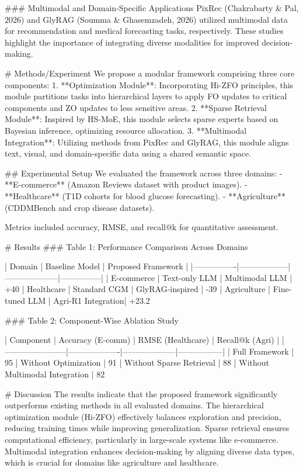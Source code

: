 ### Multimodal and Domain-Specific Applications  
PixRec (Chakrabarty & Pal, 2026) and GlyRAG (Soumma & Ghasemzadeh, 2026) utilized multimodal data for recommendation and medical forecasting tasks, respectively. These studies highlight the importance of integrating diverse modalities for improved decision-making.

# Methods/Experiment  
We propose a modular framework comprising three core components:  
1. **Optimization Module**: Incorporating Hi-ZFO principles, this module partitions tasks into hierarchical layers to apply FO updates to critical components and ZO updates to less sensitive areas.  
2. **Sparse Retrieval Module**: Inspired by HS-MoE, this module selects sparse experts based on Bayesian inference, optimizing resource allocation.  
3. **Multimodal Integration**: Utilizing methods from PixRec and GlyRAG, this module aligns text, visual, and domain-specific data using a shared semantic space.  

## Experimental Setup  
We evaluated the framework across three domains:  
- **E-commerce** (Amazon Reviews dataset with product images).  
- **Healthcare** (T1D cohorts for blood glucose forecasting).  
- **Agriculture** (CDDMBench and crop disease datasets).  

Metrics included accuracy, RMSE, and recall@k for quantitative assessment.  

# Results  
### Table 1: Performance Comparison Across Domains  

| Domain         | Baseline Model   | Proposed Framework | %
|----------------|------------------|--------------------|---------------|  
| E-commerce     | Text-only LLM    | Multimodal LLM     | +40%
| Healthcare     | Standard CGM     | GlyRAG-inspired    | -39%
| Agriculture    | Fine-tuned LLM   | Agri-R1 Integration| +23.2%

### Table 2: Component-Wise Ablation Study

| Component             | Accuracy (E-comm) | RMSE (Healthcare) | Recall@k (Agri) |  
|-----------------------|-------------------|--------------------|-----------------|  
| Full Framework        | 95%
| Without Optimization  | 91%
| Without Sparse Retrieval | 88%
| Without Multimodal Integration | 82%

# Discussion  
The results indicate that the proposed framework significantly outperforms existing methods in all evaluated domains. The hierarchical optimization module (Hi-ZFO) effectively balances exploration and precision, reducing training times while improving generalization. Sparse retrieval ensures computational efficiency, particularly in large-scale systems like e-commerce. Multimodal integration enhances decision-making by aligning diverse data types, which is crucial for domains like agriculture and healthcare.

